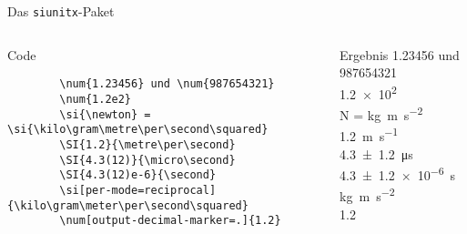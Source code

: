\begin{frame}[fragile]{Das \texttt{siunitx}-Paket}
  \begin{columns}[onlytextwidth, t]
    \begin{column}{0.60\textwidth}
      \begin{block}{Code}
        \begin{lstlisting}
        \num{1.23456} und \num{987654321}
        \num{1.2e2}
        \si{\newton} = \si{\kilo\gram\metre\per\second\squared}
        \SI{1.2}{\metre\per\second}
        \SI{4.3(12)}{\micro\second}
        \SI{4.3(12)e-6}{\second}
        \si[per-mode=reciprocal]{\kilo\gram\meter\per\second\squared}
        \num[output-decimal-marker=.]{1.2}
        \end{lstlisting}
      \end{block}
    \end{column}
    \begin{column}{0.36\textwidth}
      \begin{block}{Ergebnis}
        \num{1.23456} und \num{987654321} \\
        \num{1.2e2} \\
        \smallbreak
        \si{\newton} = \si{\kilo\gram\metre\per\second\squared} \\
        \medbreak
        \SI{1.2}{\metre\per\second} \\
        \SI{4.3(12)}{\micro\second} \\
        \SI{4.3(12)e-6}{\second} \\
        \si[per-mode=reciprocal]{\kilo\gram\meter\per\second\squared} \\[\baselineskip]
        \num[output-decimal-marker=.]{1.2}
      \end{block}
    \end{column}
  \end{columns}
\end{frame}
